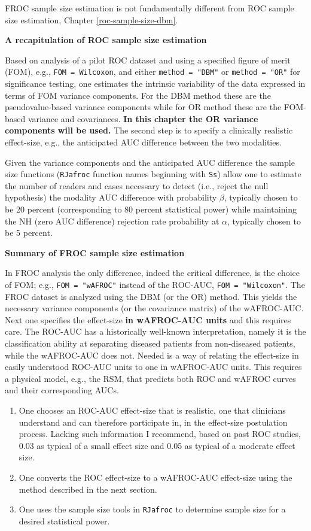 \documentclass[
]{book}
\begin{document}
FROC sample size estimation is not fundamentally different from ROC sample size estimation, Chapter \ref{roc-sample-size-dbm}.

\textbf{A recapitulation of ROC sample size estimation}

Based on analysis of a pilot ROC dataset and using a specified figure of merit (FOM), e.g., \texttt{FOM\ =\ Wilcoxon}, and either \texttt{method\ =\ "DBM"} or \texttt{method\ =\ "OR"} for significance testing, one estimates the intrinsic variability of the data expressed in terms of FOM variance components. For the DBM method these are the pseudovalue-based variance components while for OR method these are the FOM-based variance and covariances. \textbf{In this chapter the OR variance components will be used.} The second step is to specify a clinically realistic effect-size, e.g., the anticipated AUC difference between the two modalities.

Given the variance components and the anticipated AUC difference the sample size functions (\texttt{RJafroc} function names beginning with \texttt{Ss}) allow one to estimate the number of readers and cases necessary to detect (i.e., reject the null hypothesis) the modality AUC difference with probability \(\beta\), typically chosen to be 20 percent (corresponding to 80 percent statistical power) while maintaining the NH (zero AUC difference) rejection rate probability at \(\alpha\), typically chosen to be 5 percent.

\textbf{Summary of FROC sample size estimation}

In FROC analysis the only difference, indeed the critical difference, is the choice of FOM; e.g., \texttt{FOM\ =\ "wAFROC"} instead of the ROC-AUC, \texttt{FOM\ =\ "Wilcoxon"}. The FROC dataset is analyzed using the DBM (or the OR) method. This yields the necessary variance components (or the covariance matrix) of the wAFROC-AUC. Next one specifies the effect-size \textbf{in wAFROC-AUC units} and this requires care. The ROC-AUC has a historically well-known interpretation, namely it is the classification ability at separating diseased patients from non-diseased patients, while the wAFROC-AUC does not. Needed is a way of relating the effect-size in easily understood ROC-AUC units to one in wAFROC-AUC units. This requires a physical model, e.g., the RSM, that predicts both ROC and wAFROC curves and their corresponding AUCs.

\begin{enumerate}
\def\labelenumi{\arabic{enumi}.}
\item
  One chooses an ROC-AUC effect-size that is realistic, one that clinicians understand and can therefore participate in, in the effect-size postulation process. Lacking such information I recommend, based on past ROC studies, 0.03 as typical of a small effect size and 0.05 as typical of a moderate effect size.
\item
  One converts the ROC effect-size to a wAFROC-AUC effect-size using the method described in the next section.
\item
  One uses the sample size tools in \texttt{RJafroc} to determine sample size for a desired statistical power.
\end{enumerate}
\end{document}
